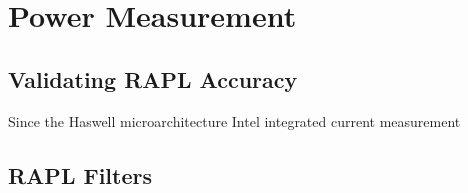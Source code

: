 \chapter{Power Measurement}

\section{Validating RAPL Accuracy}
Since the Haswell microarchitecture Intel integrated current measurement 

\section{RAPL Filters}

